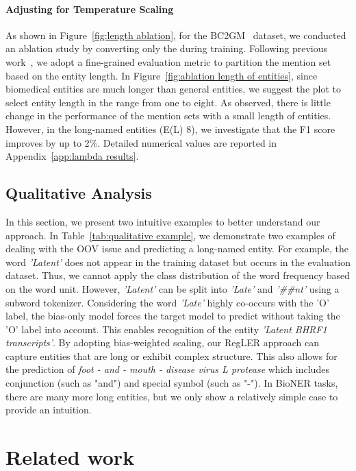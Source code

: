 \documentclass[11pt]{article}
\begin{document}
\paragraph{Adjusting  for Temperature Scaling}
\label{exp:adjust lambda}
As shown in Figure~\ref{fig:length ablation}, for the BC2GM~\cite{smith2008overview} dataset, we conducted an ablation study by converting only the  during training.
Following previous work~\cite{fu-etal-2020-interpretable}, we adopt a fine-grained evaluation metric to partition the mention set based on the entity length.
In Figure~\ref{fig:ablation length of entities}, since biomedical entities are much longer than general entities, we suggest the plot to select entity length in the range from one to eight.
As observed, there is little change in the performance of the mention sets with a small length of entities.
However, in the long-named entities (E(L)  8), we investigate that the F1 score improves by up to 2\%.
Detailed numerical values are reported in Appendix~\ref{app:lambda results}.

\subsection{Qualitative Analysis}
\label{sec:informative}
In this section, we present two intuitive examples to better understand our approach.
In Table~\ref{tab:qualitative example}, we demonstrate two examples of dealing with the OOV issue and predicting a long-named entity.
For example, the word \textit{'Latent'} does not appear in the training dataset but occurs in the evaluation dataset.
Thus, we cannot apply the class distribution of the word frequency based on the word unit.
However, \textit{'Latent'} can be split into \textit{'Late'} and \textit{'\#\#nt'} using a subword tokenizer.
Considering the word \textit{'Late'} highly co-occurs with the 'O' label, the bias-only model forces the target model to predict without taking the 'O' label into account.
This enables recognition of the entity \textit{'Latent BHRF1 transcripts'}.
By adopting bias-weighted scaling, our RegLER approach can capture entities that are long or exhibit complex structure.
This also allows for the prediction of \textit{foot - and - mouth - disease virus L protease} which includes conjunction (such as "and") and special symbol (such as "-").
In BioNER tasks, there are many more long entities, but we only show a relatively simple case to provide an intuition.


\section{Related work}
\end{document}
